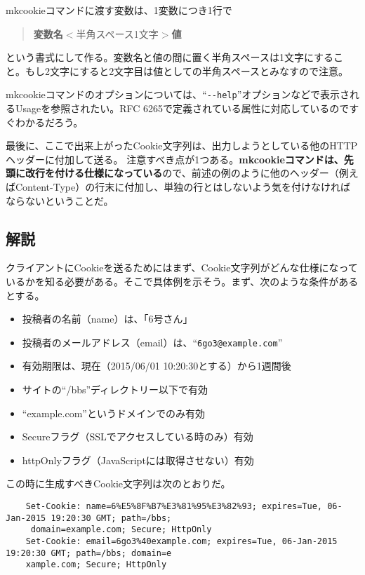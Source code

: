 mkcookieコマンドに渡す変数は、1変数につき1行で
\begin{quote}
	\textbf{変数名}$<$半角スペース1文字$>$\textbf{値}
\end{quote}
という書式にして作る。変数名と値の間に置く半角スペースは1文字にすること。もし2文字にすると2文字目は値としての半角スペースとみなすので注意。

mkcookieコマンドのオプションについては、``\verb|--help|''オプションなどで表示されるUsageを参照されたい。RFC 6265で定義されている属性に対応しているのですぐわかるだろう。

最後に、ここで出来上がったCookie文字列は、出力しようとしている他のHTTPヘッダーに付加して送る。
注意すべき点が1つある。\textbf{mkcookieコマンドは、先頭に改行を付ける仕様になっている}ので、前述の例のように他のヘッダー（例えばContent-Type）の行末に付加し、単独の行とはしないよう気を付けなければならないということだ。

\subsection*{解説}

クライアントにCookieを送るためにはまず、Cookie文字列がどんな仕様になっているかを知る必要がある。そこで具体例を示そう。まず、次のような条件があるとする。
\begin{itemize}
  \item 投稿者の名前（name）は、「6号さん」
  \item 投稿者のメールアドレス（email）は、``\verb|6go3@example.com|''
  \item 有効期限は、現在（2015/06/01 10:20:30とする）から1週間後
  \item サイトの``/bbs''ディレクトリー以下で有効
  \item ``example.com''というドメインでのみ有効
  \item Secureフラグ（SSLでアクセスしている時のみ）有効
  \item httpOnlyフラグ（JavaScriptには取得させない）有効
\end{itemize}

この時に生成すべきCookie文字列は次のとおりだ。\\
\begin{frameboxit}{160.0mm}
\begin{verbatim}
	Set-Cookie: name=6%E5%8F%B7%E3%81%95%E3%82%93; expires=Tue, 06-Jan-2015 19:20:30 GMT; path=/bbs;
	 domain=example.com; Secure; HttpOnly
	Set-Cookie: email=6go3%40example.com; expires=Tue, 06-Jan-2015 19:20:30 GMT; path=/bbs; domain=e
	xample.com; Secure; HttpOnly
\end{verbatim}
\end{frameboxit}

